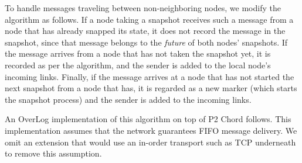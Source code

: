 \documentclass{sig-alt-full}
\begin{document}
To handle messages traveling between
non-neighboring nodes, we modify the algorithm as follows.
If a node taking a snapshot receives such a message from a node that has
already snapped its state, it does not record the message in the
snapshot, since that message belongs to the \emph{future} of both
nodes' snapshots.  If the message arrives from a node that has not taken
the snapshot yet, it is recorded as per the algorithm, and the sender is
added to the local node's incoming links.  Finally, if the message
arrives at a node that has not started the next snapshot from a node
that has, it is regarded as a new marker (which starts the snapshot 
process) and the sender is added to the incoming links.

An OverLog implementation of this algorithm on top of P2 Chord follows.
This implementation assumes that the network guarantees FIFO message
delivery.  We omit an extension that would use an in-order transport such as TCP
underneath to remove this assumption.
\end{document}
